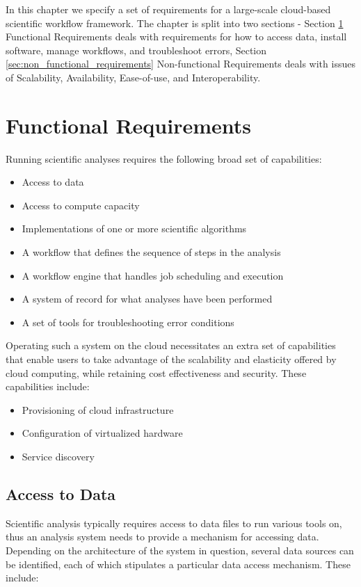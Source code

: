 In this chapter we specify a set of requirements for a large-scale cloud-based scientific workflow framework. The chapter is split into two sections - Section \ref{sec:functional_requirements} Functional Requirements deals with requirements for how to access data, install software, manage workflows, and troubleshoot errors, Section \ref{sec:non_functional_requirements} Non-functional Requirements deals with issues of Scalability, Availability, Ease-of-use, and Interoperability.

\section{Functional Requirements}\label{sec:functional_requirements}

Running scientific analyses requires the following broad set of capabilities:
\begin{itemize}
\item Access to data
\item Access to compute capacity
\item Implementations of one or more scientific algorithms
\item A workflow that defines the sequence of steps in the analysis
\item A workflow engine that handles job scheduling and execution
\item A system of record for what analyses have been performed
\item A set of tools for troubleshooting error conditions
\end{itemize}

Operating such a system on the cloud necessitates an extra set of capabilities that enable users to take advantage of the scalability and elasticity offered by cloud computing, while retaining cost effectiveness and security. 
\newpage
These capabilities include:
\begin{itemize}
\item Provisioning of cloud infrastructure
\item Configuration of virtualized hardware
\item Service discovery
\end{itemize}

\subsection {Access to Data} \label{sec:access_to_data}

Scientific analysis typically requires access to data files to run various tools on, thus an analysis system needs to provide a mechanism for accessing data. Depending on the architecture of the system in question, several data sources can be identified, each of which stipulates a particular data access mechanism. These include:

